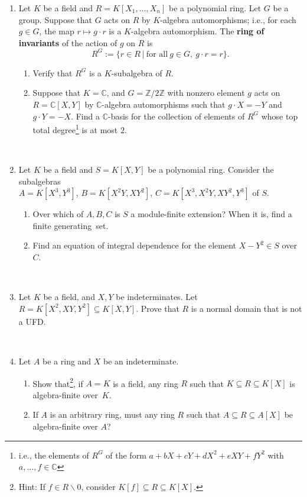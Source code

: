 \documentclass[12pt]{amsart}
\newcommand{\Z}{\mathbb{Z}}
\newcommand{\C}{\mathbb{C}}
\begin{document}
	
\begin{enumerate}

\item Let $K$ be a field and $R=K[X_1,\dots,X_n]$ be a polynomial ring. Let $G$ be a group. Suppose that $G$ acts on $R$ by $K$-algebra automorphisms; i.e., for each $g\in G$, the map $r\mapsto g\cdot r$ is a $K$-algebra automorphism. The \textbf{ring of invariants} of the action of $g$ on $R$ is 
\[ R^G := \{ r\in R \ | \ \text{for all} \ g\in G, \ g\cdot r=r\}.\]
\begin{enumerate}
\item Verify that $R^G$ is a $K$-subalgebra of $R$.
\item Suppose that $K=\C$, and $G=\Z/2\Z$ with nonzero element $g$ acts on $R=\C[X,Y]$ by $\C$-algebra automorphisms such that $g \cdot X= -Y$ and $g \cdot Y= -X$. Find a $\C$-basis for the collection of elements of $R^G$ whose top total degree\footnote{i.e., the elements of $R^G$ of the form $a+bX+cY+dX^2+eXY+fY^2$ with $a,\dots,f\in \C$} is at most $2$.
\end{enumerate}

\


\item Let $K$ be a field and $S=K[X,Y]$ be a polynomial ring. Consider the subalgebras\\ ${A=K[X^3,Y^3]}$, $B=K[X^2Y, XY^2]$, $C=K[X^3,X^2Y,XY^2,Y^3]$ of $S$.
\begin{enumerate}
\item Over which of $A,B,C$ is $S$ a module-finite extension? When it is, find a finite generating~set.
\item Find an equation of integral dependence for the element $X-Y^2\in S$ over $C$.
\end{enumerate}

\


\item Let $K$ be a field, and $X,Y$ be indeterminates. Let $R=K[X^2,XY,Y^2] \subseteq K[X,Y]$. Prove that $R$ is a normal domain that is not a UFD.

\


\item Let $A$ be a ring and $X$ be an indeterminate.  
\begin{enumerate}
\item Show that\footnote{Hint: If $f\in R\smallsetminus 0$, consider $K[f] \subseteq R \subseteq K[X]$.}, if $A=K$ is a field, any ring $R$ such that $K\subseteq R \subseteq K[X]$ is algebra-finite over~$K$.
\item If $A$ is an arbitrary ring, must any ring $R$ such that $A\subseteq R \subseteq A[X]$ be algebra-finite over $A$?
\end{enumerate}


\end{enumerate}
\end{document}
